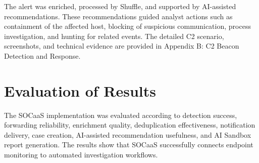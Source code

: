 The alert was enriched, processed by Shuffle, and supported by AI-assisted recommendations. These recommendations guided analyst actions such as containment of the affected host, blocking of suspicious communication, process investigation, and hunting for related events. The detailed C2 scenario, screenshots, and technical evidence are provided in Appendix B: C2 Beacon Detection and Response.

\section{Evaluation of Results}
\label{sec:ch4-evaluation}

The SOCaaS implementation was evaluated according to detection success, forwarding reliability, enrichment quality, deduplication effectiveness, notification delivery, case creation, AI-assisted recommendation usefulness, and AI Sandbox report generation. The results show that SOCaaS successfully connects endpoint monitoring to automated investigation workflows.

